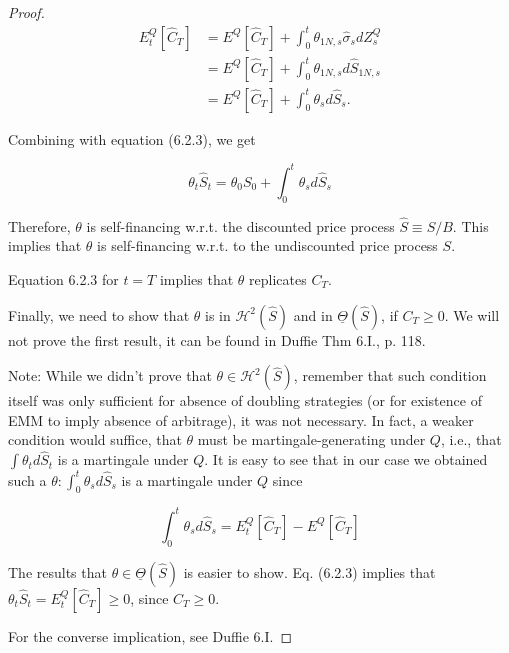 \documentclass[\topdir/lecture\_notes.tex]{subfiles}
\begin{document}
\begin{proof}
\begin{equation}
\begin{aligned}
E_{t}^{Q}\left[\hat{C}_{T}\right] & =E^{Q}\left[\hat{C}_{T}\right]+\int_{0}^{t} \theta_{1 N, s} \hat{\sigma}_{s} d Z_{s}^{Q} \\
& =E^{Q}\left[\hat{C}_{T}\right]+\int_{0}^{t} \theta_{1 N, s} d \hat{S}_{1 N, s} \\
& =E^{Q}\left[\hat{C}_{T}\right]+\int_{0}^{t} \theta_{s} d \hat{S}_{s} .
\end{aligned}
\end{equation}

Combining with equation (6.2.3), we get

\begin{equation}
\theta_{t} \hat{S}_{t}=\theta_{0} S_{0}+\int_{0}^{t} \theta_{s} d \hat{S}_{s}
\end{equation}

Therefore, \(\theta\) is self-financing w.r.t. the discounted price process \(\hat{S} \equiv S / B\). This implies that \(\theta\) is self-financing w.r.t. to the undiscounted price process \(S\).

Equation 6.2.3 for \(t=T\) implies that \(\theta\) replicates \(C_{T}\).

Finally, we need to show that \(\theta\) is in \(\mathcal{H}^{2}(\hat{S})\) and in \(\underline{\Theta}(\hat{S})\), if \(C_{T} \geq 0\). We will not prove the first result, it can be found in Duffie Thm 6.I., p. 118.

Note: While we didn't prove that \(\theta \in \mathcal{H}^{2}(\hat{S})\), remember that such condition itself was only sufficient for absence of doubling strategies (or for existence of EMM to imply absence of arbitrage), it was not necessary. In fact, a weaker condition would suffice, that \(\theta\) must be martingale-generating under \(Q\), i.e., that \(\int \theta_{t} d \hat{S}_{t}\) is a martingale under \(Q\). It is easy to see that in our case we obtained such a \(\theta: \int_{0}^{t} \theta_{s} d \hat{S}_{s}\) is a martingale under \(Q\) since

\begin{equation}
\int_{0}^{t} \theta_{s} d \hat{S}_{s}=E_{t}^{Q}\left[\hat{C}_{T}\right]-E^{Q}\left[\hat{C}_{T}\right] \label{eq:6.2.4}
\end{equation}

The results that \(\theta \in \underline{\Theta}(\hat{S})\) is easier to show. Eq. (6.2.3) implies that \(\theta_{t} \hat{S}_{t}=E_{t}^{Q}\left[\hat{C}_{T}\right] \geq 0\), since \(C_{T} \geq 0\).

For the converse implication, see Duffie 6.I.
\end{proof}
\end{document}
